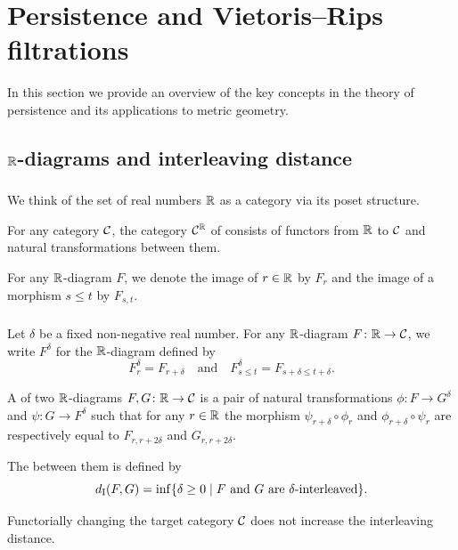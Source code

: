 
\section{Persistence and Vietoris--Rips filtrations}

In this section we provide an overview of the key concepts in the theory of persistence and its applications to metric geometry.

\subsection{$\mathbb{R}$-diagrams and interleaving distance}

\subsubsection{}

We think of the set of real numbers $\mathbb{R}$ as a category via its poset structure.

For any category $\mathcal{C}$, the category $\mathcal{C}^{\mathbb{R}}$ of  consists of functors from $\mathbb{R}$ to $\mathcal{C}$ and natural transformations between them.

For any $\mathbb{R}$-diagram $F$, we denote the image of $r \in \mathbb{R}$ by $F_r$ and the image of a morphism $s \leq t$ by $F_{s,t}$.

\subsubsection{}\label{ss:interleaving}

Let $\delta$ be a fixed non-negative real number.
For any $\mathbb{R}$-diagram $F \colon \mathbb{R} \to \mathcal{C}$, we write $F^\delta$ for the $\mathbb{R}$-diagram defined by
\[
F^\delta_r = F_{r+\delta}
\quad\text{and}\quad
F^\delta_{s \leq t} = F_{s+\delta \leq t+\delta}.
\]

A  of two $\mathbb{R}$-diagrams $F,G \colon \mathbb{R} \to \mathcal{C}$ is a pair of natural transformations
$\phi \colon F \to G^\delta$ and $\psi \colon G \to F^\delta$ such that for any $r \in \mathbb{R}$ the morphism $\psi_{r+\delta} \circ \phi_r$ and $\phi_{r+\delta} \circ \psi_r$ are respectively equal to $F_{r,r+2\delta}$ and $G_{r,r+2\delta}$.

The  between them is defined by
\[
d_{\mathrm{I}}(F, G) = \inf\{\delta \geq 0 \mid F \text{ and } G \text{ are } \delta\text{-interleaved}\}.
\]

Functorially changing the target category $\mathcal{C}$ does not increase the interleaving distance.

